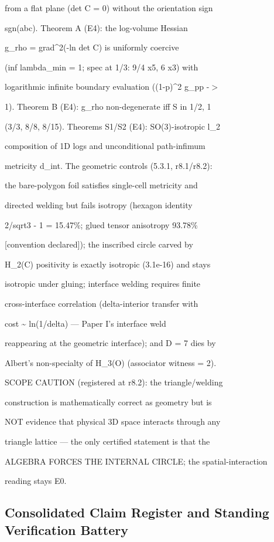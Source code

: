 \documentclass[11pt,a4paper]{article}
\theoremstyle{definition}
\begin{document}
    from a flat plane (det C = 0) without the orientation sign

    sgn(abc). Theorem A (E4): the log-volume Hessian

    g\_rho = grad\^{}2(-ln det C) is uniformly coercive

    (inf lambda\_min = 1; spec at 1/3: {9/4 x5, 6 x3}) with

    logarithmic infinite boundary evaluation ((1-p)\^{}2 g\_pp -$>$

    1). Theorem B (E4): g\_rho non-degenerate iff S in {1/2, 1}

    (3/3, 8/8, 8/15). Theorems S1/S2 (E4): SO(3)-isotropic l\_2

    composition of 1D logs and unconditional path-infimum

    metricity d\_int. The geometric controls (5.3.1, r8.1/r8.2):

    the bare-polygon foil satisfies single-cell metricity and

    directed welding but fails isotropy (hexagon identity

    2/sqrt3 - 1 = 15.47\%; glued tensor anisotropy 93.78\%

    [convention declared]); the inscribed circle carved by

    H\_2(C) positivity is exactly isotropic (3.1e-16) and stays

    isotropic under gluing; interface welding requires finite

    cross-interface correlation (delta-interior transfer with

    cost \textasciitilde{} ln(1/delta) — Paper I's interface weld

    reappearing at the geometric interface); and D = 7 dies by

    Albert's non-specialty of H\_3(O) (associator witness = 2).

    SCOPE CAUTION (registered at r8.2): the triangle/welding

    construction is mathematically correct as geometry but is

    NOT evidence that physical 3D space interacts through any

    triangle lattice — the only certified statement is that the

    ALGEBRA FORCES THE INTERNAL CIRCLE; the spatial-interaction

    reading stays E0.


\subsection{Consolidated Claim Register and Standing Verification Battery}
\end{document}
